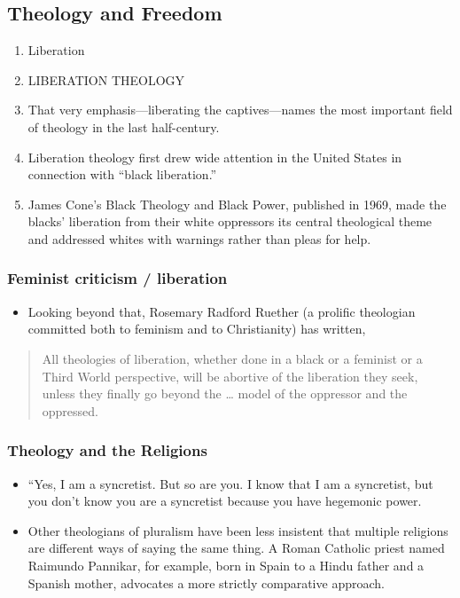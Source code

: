 \documentclass[11pt]{article}
\begin{document}
\subsection*{Theology and Freedom}
\label{theology-and-freedom}
\begin{enumerate}
\item Liberation
\item LIBERATION THEOLOGY

\item That very emphasis---liberating the captives---names the most important field of theology in the last half-century.
\item Liberation theology first drew wide attention in the United States in connection with “black liberation.”
\item James Cone's Black Theology and Black Power, published in 1969, made the blacks' liberation from their white oppressors its central theological theme and addressed whites with warnings rather than pleas for help.
\end{enumerate}

\subsubsection*{Feminist criticism / liberation}
\label{sec:org4a56f4c}

\begin{itemize}
\item Looking beyond that, Rosemary Radford Ruether (a prolific theologian committed both to feminism and to Christianity) has written,
\end{itemize}

\begin{quote}
All theologies of liberation, whether done in a black or a feminist or a Third World perspective, will be abortive of the liberation they seek, unless they finally go beyond the \ldots{} model of the oppressor and the oppressed.
\end{quote}

\subsubsection*{Theology and the Religions}
\label{sec:orgd5e5ac4}

\begin{itemize}
\item “Yes, I am a syncretist. But so are you. I know that I am a syncretist, but you don't know you are a syncretist because you have hegemonic power.
\item Other theologians of pluralism have been less insistent that multiple religions are different ways of saying the same thing. A Roman Catholic priest named Raimundo Pannikar, for example, born in Spain to a Hindu father and a Spanish mother, advocates a more strictly comparative approach.
\end{itemize}
\end{document}
